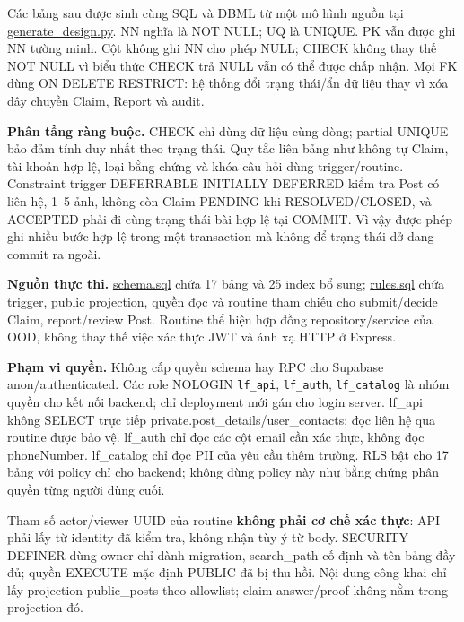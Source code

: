 Các bảng sau được sinh cùng SQL và DBML từ một mô hình nguồn tại \href{run:../../../docs/design/database/generate_design.py}{generate\_design.py}. NN nghĩa là NOT NULL; UQ là UNIQUE. PK vẫn được ghi NN tường minh. Cột không ghi NN cho phép NULL; CHECK không thay thế NOT NULL vì biểu thức CHECK trả NULL vẫn có thể được chấp nhận. Mọi FK dùng ON DELETE RESTRICT: hệ thống đổi trạng thái/ẩn dữ liệu thay vì xóa dây chuyền Claim, Report và audit.

\textbf{Phân tầng ràng buộc.} CHECK chỉ dùng dữ liệu cùng dòng; partial UNIQUE bảo đảm tính duy nhất theo trạng thái. Quy tắc liên bảng như không tự Claim, tài khoản hợp lệ, loại bằng chứng và khóa câu hỏi dùng trigger/routine. Constraint trigger DEFERRABLE INITIALLY DEFERRED kiểm tra Post có liên hệ, 1--5 ảnh, không còn Claim PENDING khi RESOLVED/CLOSED, và ACCEPTED phải đi cùng trạng thái bài hợp lệ tại COMMIT. Vì vậy được phép ghi nhiều bước hợp lệ trong một transaction mà không để trạng thái dở dang commit ra ngoài.

\textbf{Nguồn thực thi.} \href{run:../../../docs/design/database/schema.sql}{schema.sql} chứa 17 bảng và 25 index bổ sung; \href{run:../../../docs/design/database/rules.sql}{rules.sql} chứa trigger, public projection, quyền đọc và routine tham chiếu cho submit/decide Claim, report/review Post. Routine thể hiện hợp đồng repository/service của OOD, không thay thế việc xác thực JWT và ánh xạ HTTP ở Express.

\textbf{Phạm vi quyền.} Không cấp quyền schema hay RPC cho Supabase anon/authenticated. Các role NOLOGIN \texttt{lf\_api}, \texttt{lf\_auth}, \texttt{lf\_catalog} là nhóm quyền cho kết nối backend; chỉ deployment mới gán cho login server. lf\_api không SELECT trực tiếp private.post\_details/user\_contacts; đọc liên hệ qua routine được bảo vệ. lf\_auth chỉ đọc các cột email cần xác thực, không đọc phoneNumber. lf\_catalog chỉ đọc PII của yêu cầu thêm trường. RLS bật cho 17 bảng với policy chỉ cho backend; không dùng policy này như bằng chứng phân quyền từng người dùng cuối.

Tham số actor/viewer UUID của routine \textbf{không phải cơ chế xác thực}: API phải lấy từ identity đã kiểm tra, không nhận tùy ý từ body. SECURITY DEFINER dùng owner chỉ dành migration, search\_path cố định và tên bảng đầy đủ; quyền EXECUTE mặc định PUBLIC đã bị thu hồi. Nội dung công khai chỉ lấy projection public\_posts theo allowlist; claim answer/proof không nằm trong projection đó.
